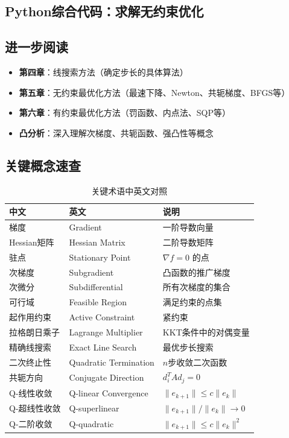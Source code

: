 \subsection{Python综合代码：求解无约束优化}

\subsection{进一步阅读}

\begin{notebox}[后续章节关联]
\begin{itemize}[itemsep=0.3em]
    \item \textbf{第四章}：线搜索方法（确定步长的具体算法）
    \item \textbf{第五章}：无约束最优化方法（最速下降、Newton、共轭梯度、BFGS等）
    \item \textbf{第六章}：有约束最优化方法（罚函数、内点法、SQP等）
    \item \textbf{凸分析}：深入理解次梯度、共轭函数、强凸性等概念
\end{itemize}
\end{notebox}

\subsection{关键概念速查}

\begin{table}[htbp]
\centering
\caption{关键术语中英文对照}
\begin{tabular}{@{}lll@{}}
\toprule
\textbf{中文} & \textbf{英文} & \textbf{说明} \\
\midrule
梯度 & Gradient & 一阶导数向量 \\
Hessian矩阵 & Hessian Matrix & 二阶导数矩阵 \\
驻点 & Stationary Point & $\nabla f = 0$ 的点 \\
次梯度 & Subgradient & 凸函数的推广梯度 \\
次微分 & Subdifferential & 所有次梯度的集合 \\
可行域 & Feasible Region & 满足约束的点集 \\
起作用约束 & Active Constraint & 紧约束 \\
拉格朗日乘子 & Lagrange Multiplier & KKT条件中的对偶变量 \\
精确线搜索 & Exact Line Search & 最优步长搜索 \\
二次终止性 & Quadratic Termination & $n$步收敛二次函数 \\
共轭方向 & Conjugate Direction & $d_i^T A d_j = 0$ \\
Q-线性收敛 & Q-linear Convergence & $\|e_{k+1}\| \leq c\|e_k\|$ \\
Q-超线性收敛 & Q-superlinear & $\|e_{k+1}\|/\|e_k\| \to 0$ \\
Q-二阶收敛 & Q-quadratic & $\|e_{k+1}\| \leq c\|e_k\|^2$ \\
\bottomrule
\end{tabular}
\end{table}

\newpage

